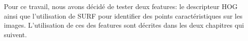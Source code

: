 

Pour ce travail, nous avons décidé de tester deux features: le descripteur HOG ainsi que l'utilisation de SURF pour identifier des points caractéristiques sur les images. L'utilisation de ces des features sont décrites dans les deux chapitres qui suivent.
